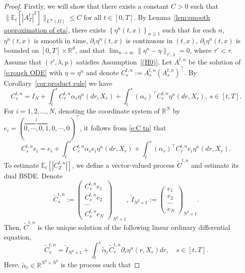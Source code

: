 \documentclass[11pt,reqno]{amsart}
\def\R{\mathbb R}
\def\E{\mathbb E}
\numberwithin{equation}{section}
\begin{document}
\begin{proof}
Firstly, we will show that there exists a constant $C>0$ such that $\|\mathbb{E}_{t}\left[|A^{t}_{T}|^2\right]\|_{L^{\infty}(\Omega)}\le C$ for all $t\in[0,T]$.
By Lemma~\ref{lem:smooth approximation of eta}, there exists $\left\{\eta^{n}(t,x)\right\}_{n\ge 1}$  such that for each $n$, $\eta^{n}(t,x)$ is smooth in time, $\partial_{t}\eta^{n}(t,x)$ is continuous in $(t,x)$, $\partial_{t}\eta^{n}(t,x)$ is bounded on $[0,T]\times\R^d$, and that $\lim_{n\to\infty}\|\eta^{n} - \eta\|_{\tau',\lambda}=0$, where $\tau'<\tau$. Assume that $(\tau',\lambda,p)$ satisfies Assumption~\ref{(H0)}. Let $A^{t,n}_{\cdot}$ be the solution of \eqref{e:rough ODE} with $\eta=\eta^{n}$ and denote $C^{t,n}_{s} := A^{t,n}_{s} (A^{t,n}_{s})^{\top}$. 
By  Corollary~\ref{cor:product rule} we have 
\begin{equation}\label{e:C tn}
C^{t,n}_{s} = I_{N} + \int_{t}^{s} C^{t,n}_r \alpha_r \eta^n(dr,X_r) + \int_{t}^{s}(\alpha_r)^{\top}C^{t,n}_r\eta^{n}(dr,X_r),~s\in[t,T].
\end{equation}
For $i=1,2,...,N$, denoting the coordinate system of $\mathbb{R}^{N}$ by $e_i = (\overbrace{0,\cdots,0,1}^{i},0,\cdots,0)^{\top}$, it follows from \eqref{e:C tn} that 
\[C^{t,n}_{s} e_i = e_i + \int_{t}^{s} C^{t,n}_r \alpha_r e_i \eta^n(dr,X_r) + \int_{t}^{s}(\alpha_r)^{\top}C^{t,n}_re_i\eta^{n}(dr,X_r).\]
To estimate $\E_{t}[|C^{t,n}_{T}|]$, we define a vector-valued process $\tilde{C}^{t,n}$ and estimate its dual BSDE. Denote
\begin{equation*}
\tilde{C}^{t,n}_{s} := \begin{pmatrix}
C^{t,n}_s e_{1}\\
C^{t,n}_s e_{2}\\
\cdots\\
C^{t,n}_s e_{N}
\end{pmatrix}_{N^{2}\times 1},\ 
\tilde{I}_{N^{2}\times 1} := \begin{pmatrix}
e_{1}\\
e_{2}\\
\cdots\\
e_{N}
\end{pmatrix}_{N^{2}\times 1}.
\end{equation*}
Then, $\tilde{C}^{t,n}$ is the unique solution of the following linear ordinary differential equation, 
\begin{equation*}
\tilde{C}^{t,n}_{s} = \tilde{I}_{N^{2}\times 1} + \int_{t}^{s} \tilde{\alpha}_r \tilde{C}^{t,n}_r  \partial_{r}\eta^n(r,X_r)dr,\quad s\in[t,T].
\end{equation*}
Here, $\tilde{\alpha}_{r}\in \mathbb{R}^{N^{2}\times N^{2}}$ is the process such that

\end{proof}
\end{document}

